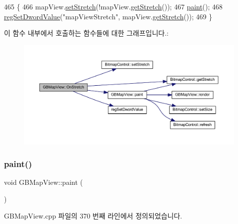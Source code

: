 \begin{DoxyCode}
465 \{
466   mapView.\mbox{\hyperlink{class_bitmap_control_ab545e15ea3edda9f0d80c0b8b0b7c812}{setStretch}}(!mapView.\mbox{\hyperlink{class_bitmap_control_a1d3cff9a3b57dd7558d678177dcf4b5c}{getStretch}}());
467   \mbox{\hyperlink{class_g_b_map_view_a42de669273417186b01ca6f8d06eb347}{paint}}();
468   \mbox{\hyperlink{_reg_8cpp_a758e775489a3fb5c3cc7071fdd5af87e}{regSetDwordValue}}(\textcolor{stringliteral}{"mapViewStretch"}, mapView.\mbox{\hyperlink{class_bitmap_control_a1d3cff9a3b57dd7558d678177dcf4b5c}{getStretch}}());  
469 \}
\end{DoxyCode}
이 함수 내부에서 호출하는 함수들에 대한 그래프입니다.\+:
\nopagebreak
\begin{figure}[H]
\begin{center}
\leavevmode
\includegraphics[width=350pt]{class_g_b_map_view_a9938d288e7e3c1b36757cbf49ff4bb97_cgraph}
\end{center}
\end{figure}
\mbox{\label{class_g_b_map_view_a42de669273417186b01ca6f8d06eb347}} 
\subsubsection{\texorpdfstring{paint()}{paint()}}
{\footnotesize\ttfamily void G\+B\+Map\+View\+::paint (\begin{DoxyParamCaption}{ }\end{DoxyParamCaption})}



G\+B\+Map\+View.\+cpp 파일의 370 번째 라인에서 정의되었습니다.



